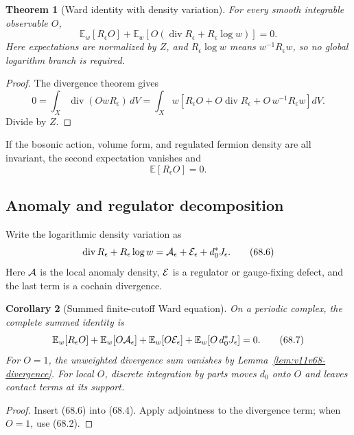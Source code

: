 \documentclass[11pt]{article}
\newtheorem{theorem}{Theorem}[section]
\newtheorem{corollary}[theorem]{Corollary}
\begin{document}
\begin{theorem}[Ward identity with density variation]
\label{thm:v11v68-ward}
For every smooth integrable observable \(O\),
\[
 \boxed{
 {\mathbb E}_w[R_\epsilon O]
 +{\mathbb E}_w\!\left[
 O\left(\operatorname{div}R_\epsilon+
              R_\epsilon\log w\right)\right]=0.}             \tag{68.4}
\]
Here expectations are normalized by \(Z\), and
\(R_\epsilon\log w\) means \(w^{-1}R_\epsilon w\), so no global
logarithm branch is required.
\end{theorem}

\begin{proof}
The divergence theorem gives
\[
 0=\int_X\operatorname{div}(OwR_\epsilon)\,dV
  =\int_Xw\left[
 R_\epsilon O+
 O\operatorname{div}R_\epsilon+
 O\,w^{-1}R_\epsilon w\right]dV.
\]
Divide by \(Z\).
\end{proof}

If the bosonic action, volume form, and regulated fermion density are
all invariant, the second expectation vanishes and
\[
                              {\mathbb E}[R_\epsilon O]=0.     \tag{68.5}
\]

\subsection{Anomaly and regulator decomposition}

Write the logarithmic density variation as
\[
 \operatorname{div}R_\epsilon+R_\epsilon\log w
       ={\cal A}_\epsilon+{\cal E}_\epsilon
                             +d_0^*J_\epsilon.                \tag{68.6}
\]
Here \({\cal A}\) is the local anomaly density, \({\cal E}\) is a
regulator or gauge-fixing defect, and the last term is a cochain
divergence.

\begin{corollary}[Summed finite-cutoff Ward equation]
\label{cor:v11v68-summed}
On a periodic complex, the complete summed identity is
\[
 {\mathbb E}_w[R_\epsilon O]
 +{\mathbb E}_w[O{\cal A}_\epsilon]
 +{\mathbb E}_w[O{\cal E}_\epsilon]
 +{\mathbb E}_w[O\,d_0^*J_\epsilon]=0.                       \tag{68.7}
\]
For \(O=1\), the unweighted divergence sum vanishes by
Lemma~\ref{lem:v11v68-divergence}.  For local \(O\), discrete
integration by parts moves \(d_0\) onto \(O\) and leaves contact terms
at its support.
\end{corollary}

\begin{proof}
Insert (68.6) into (68.4).  Apply adjointness to the divergence term;
when \(O=1\), use (68.2).
\end{proof}
\end{document}
